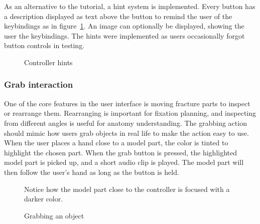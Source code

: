 \documentclass[a4paper]{report}
\begin{document}
As an alternative to the tutorial, a hint system is implemented. Every button has a description displayed as text above the button to remind the user of the keybindings as in figure~\ref{hints}. An image can optionally be displayed, showing the user the keybindings. The hints were implemented as users occasionally forgot button controls in testing.

\begin{figure}[h!]
    \centering
	\hfill
  \caption{Controller hints}\label{hints}
  \small
\end{figure}

\subsubsection{Grab interaction}

One of the core features in the user interface is moving fracture parts to inspect or rearrange them. Rearranging is important for fixation planning, and inspecting from different angles is useful for anatomy understanding.
The grabbing action should mimic how users grab objects in real life to make the action easy to use. When the user places a hand close to a model part, the color is tinted to highlight the chosen part. When the grab button is pressed, the highlighted model part is picked up, and a short audio clip is played. The model part will then follow the user's hand as long as the button is held.

\begin{figure}[h!]
    \centering
	\hfill
  \caption{Grabbing an object}\label{grabbing}
  \small
  Notice how the model part close to the controller is focused with a darker color.
\end{figure}
\end{document}
